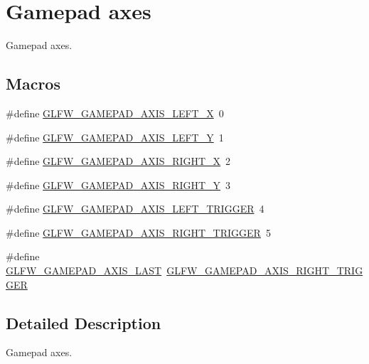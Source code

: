 \hypertarget{group__gamepad__axes}{}\section{Gamepad axes}
\label{group__gamepad__axes}


Gamepad axes.  


\subsection*{Macros}
\begin{DoxyCompactItemize}
\item 
\#define \mbox{\hyperlink{group__gamepad__axes_ga544e396d092036a7d80c1e5f233f7a38}{G\+L\+F\+W\+\_\+\+G\+A\+M\+E\+P\+A\+D\+\_\+\+A\+X\+I\+S\+\_\+\+L\+E\+F\+T\+\_\+X}}~0
\item 
\#define \mbox{\hyperlink{group__gamepad__axes_ga64dcf2c6e9be50b7c556ff7671996dd5}{G\+L\+F\+W\+\_\+\+G\+A\+M\+E\+P\+A\+D\+\_\+\+A\+X\+I\+S\+\_\+\+L\+E\+F\+T\+\_\+Y}}~1
\item 
\#define \mbox{\hyperlink{group__gamepad__axes_gabd6785106cd3c5a044a6e49a395ee2fc}{G\+L\+F\+W\+\_\+\+G\+A\+M\+E\+P\+A\+D\+\_\+\+A\+X\+I\+S\+\_\+\+R\+I\+G\+H\+T\+\_\+X}}~2
\item 
\#define \mbox{\hyperlink{group__gamepad__axes_ga1cc20566d44d521b7183681a8e88e2e4}{G\+L\+F\+W\+\_\+\+G\+A\+M\+E\+P\+A\+D\+\_\+\+A\+X\+I\+S\+\_\+\+R\+I\+G\+H\+T\+\_\+Y}}~3
\item 
\#define \mbox{\hyperlink{group__gamepad__axes_ga6d79561dd8907c37354426242901b86e}{G\+L\+F\+W\+\_\+\+G\+A\+M\+E\+P\+A\+D\+\_\+\+A\+X\+I\+S\+\_\+\+L\+E\+F\+T\+\_\+\+T\+R\+I\+G\+G\+ER}}~4
\item 
\#define \mbox{\hyperlink{group__gamepad__axes_ga121a7d5d20589a423cd1634dd6ee6eab}{G\+L\+F\+W\+\_\+\+G\+A\+M\+E\+P\+A\+D\+\_\+\+A\+X\+I\+S\+\_\+\+R\+I\+G\+H\+T\+\_\+\+T\+R\+I\+G\+G\+ER}}~5
\item 
\#define \mbox{\hyperlink{group__gamepad__axes_ga0818fd9433e1359692b7443293e5ac86}{G\+L\+F\+W\+\_\+\+G\+A\+M\+E\+P\+A\+D\+\_\+\+A\+X\+I\+S\+\_\+\+L\+A\+ST}}~\mbox{\hyperlink{group__gamepad__axes_ga121a7d5d20589a423cd1634dd6ee6eab}{G\+L\+F\+W\+\_\+\+G\+A\+M\+E\+P\+A\+D\+\_\+\+A\+X\+I\+S\+\_\+\+R\+I\+G\+H\+T\+\_\+\+T\+R\+I\+G\+G\+ER}}
\end{DoxyCompactItemize}


\subsection{Detailed Description}
Gamepad axes. 

